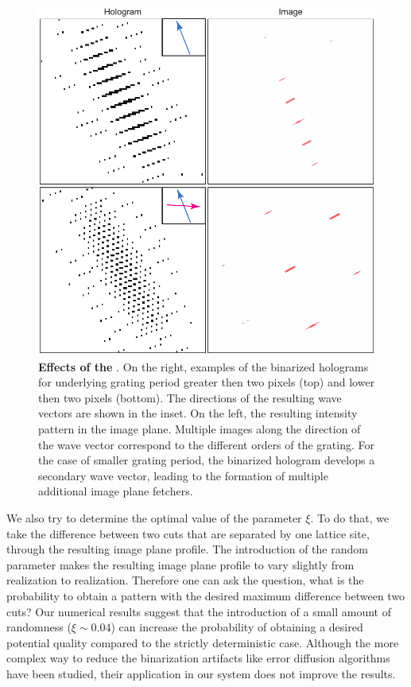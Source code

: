 \begin{figure}[t]
	\centering
	\includegraphics[scale=1]{figures/DMD_grating_bad_angle.pdf}
	\caption{{\bf Effects of the }. On the right, examples of the binarized holograms for underlying grating period greater then two pixels (top) and lower then two pixels (bottom). The directions of the resulting wave vectors are shown in the inset.  On the left, the resulting intensity pattern in the image plane. Multiple images along the direction of the wave vector correspond to the different orders of the grating. For the case of smaller grating period, the binarized hologram develops a secondary wave vector, leading to the formation of multiple additional image plane fetchers.}
	\label{fig:DMD_grating_bad_angle}
\end{figure}
 
We also try to determine the optimal value of the parameter $\xi$. To do that, we take the difference between two cuts that are separated by one lattice site, through the resulting image plane profile. The introduction of the random parameter makes the resulting image plane profile to vary slightly from realization to realization. Therefore one can ask the question, what is the probability to obtain a pattern with the desired maximum difference between two cuts? Our numerical results suggest that the introduction of a small amount of randomness ($\xi \sim 0.04$) can increase the probability of obtaining a desired potential quality compared to the strictly deterministic case. Although the more complex way to reduce the binarization artifacts like error diffusion algorithms \cite{floyd, Hu2018} have been studied, their application in our system does not improve the results. 

